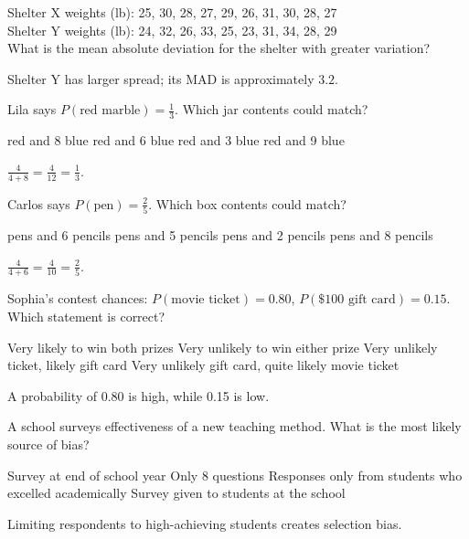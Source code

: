 \newpage 



\question[5]
Shelter X weights (lb): 25, 30, 28, 27, 29, 26, 31, 30, 28, 27\\
Shelter Y weights (lb): 24, 32, 26, 33, 25, 23, 31, 34, 28, 29\\
What is the mean absolute deviation for the shelter with greater variation?
\begin{choices}
\end{choices}
\begin{solution}
  Shelter Y has larger spread; its MAD is approximately \(3.2\).
\end{solution}

\question[5]
Lila says \(P(\text{red marble})=\frac13\). Which jar contents could match?
\begin{choices}
   red and 8 blue
   red and 6 blue
   red and 3 blue
   red and 9 blue
\end{choices}
\begin{solution}
  \(\frac{4}{4+8}=\frac{4}{12}=\frac13\).
\end{solution}

\question[5]
Carlos says \(P(\text{pen})=\frac25\). Which box contents could match?
\begin{choices}
   pens and 6 pencils
   pens and 5 pencils
   pens and 2 pencils
   pens and 8 pencils
\end{choices}
\begin{solution}
  \(\frac{4}{4+6}=\frac{4}{10}=\frac25\).
\end{solution}

\question[5]
Sophia's contest chances: \(P(\text{movie ticket})=0.80\), \(P(\$100\text{ gift card})=0.15\). Which statement is correct?
\begin{choices}
  \choice Very likely to win both prizes
  \choice Very unlikely to win either prize
  \choice Very unlikely ticket, likely gift card
  \CorrectChoice Very unlikely gift card, quite likely movie ticket
\end{choices}
\begin{solution}
  A probability of 0.80 is high, while 0.15 is low.
\end{solution}


\newpage 



\question[5]
A school surveys effectiveness of a new teaching method. What is the most likely source of bias?
\begin{choices}
  \choice Survey at end of school year
  \choice Only 8 questions
  \CorrectChoice Responses only from students who excelled academically
  \choice Survey given to students at the school
\end{choices}
\begin{solution}
  Limiting respondents to high-achieving students creates selection bias.
\end{solution}


